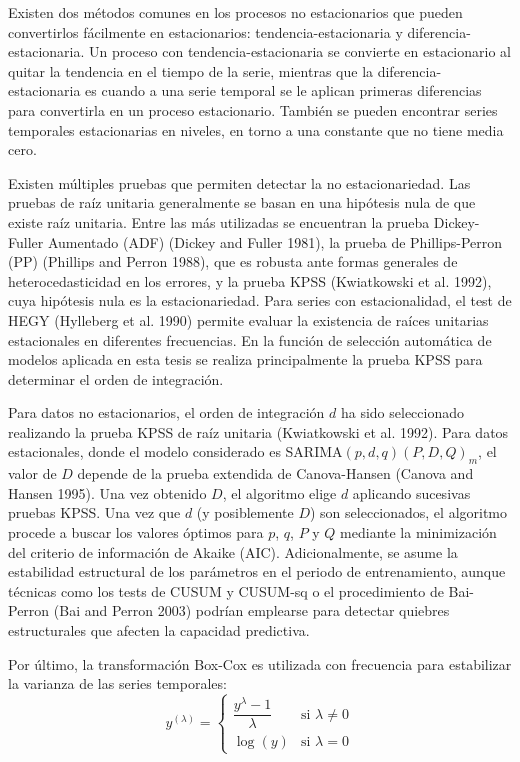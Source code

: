 \documentclass[
  12pt, a4paper, oneside]{article}
\begin{document}
Existen dos métodos comunes en los procesos no estacionarios que pueden convertirlos fácilmente en estacionarios: tendencia-estacionaria y diferencia-estacionaria. Un proceso con tendencia-estacionaria se convierte en estacionario al quitar la tendencia en el tiempo de la serie, mientras que la diferencia-estacionaria es cuando a una serie temporal se le aplican primeras diferencias para convertirla en un proceso estacionario. También se pueden encontrar series temporales estacionarias en niveles, en torno a una constante que no tiene media cero.

Existen múltiples pruebas que permiten detectar la no estacionariedad. Las pruebas de raíz unitaria generalmente se basan en una hipótesis nula de que existe raíz unitaria. Entre las más utilizadas se encuentran la prueba Dickey-Fuller Aumentado (ADF) (Dickey and Fuller 1981), la prueba de Phillips-Perron (PP) (Phillips and Perron 1988), que es robusta ante formas generales de heterocedasticidad en los errores, y la prueba KPSS (Kwiatkowski et al. 1992), cuya hipótesis nula es la estacionariedad. Para series con estacionalidad, el test de HEGY (Hylleberg et al. 1990) permite evaluar la existencia de raíces unitarias estacionales en diferentes frecuencias. En la función de selección automática de modelos aplicada en esta tesis se realiza principalmente la prueba KPSS para determinar el orden de integración.

Para datos no estacionarios, el orden de integración \(d\) ha sido seleccionado realizando la prueba KPSS de raíz unitaria (Kwiatkowski et al. 1992). Para datos estacionales, donde el modelo considerado es SARIMA\((p, d, q)(P, D, Q)_m\), el valor de \(D\) depende de la prueba extendida de Canova-Hansen (Canova and Hansen 1995). Una vez obtenido \(D\), el algoritmo elige \(d\) aplicando sucesivas pruebas KPSS. Una vez que \(d\) (y posiblemente \(D\)) son seleccionados, el algoritmo procede a buscar los valores óptimos para \(p\), \(q\), \(P\) y \(Q\) mediante la minimización del criterio de información de Akaike (AIC). Adicionalmente, se asume la estabilidad estructural de los parámetros en el periodo de entrenamiento, aunque técnicas como los tests de CUSUM y CUSUM-sq o el procedimiento de Bai-Perron (Bai and Perron 2003) podrían emplearse para detectar quiebres estructurales que afecten la capacidad predictiva.

Por último, la transformación Box-Cox es utilizada con frecuencia para estabilizar la varianza de las series temporales:
\begin{equation}
y^{(\lambda)} = \begin{cases} \dfrac{y^\lambda - 1}{\lambda} & \text{si } \lambda \neq 0 \\ \log(y) & \text{si } \lambda = 0 \end{cases}
\end{equation}
\end{document}
